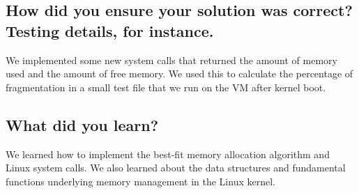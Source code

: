 \documentclass[draftclsnofoot,onecolumn,10pt,compsoc]{IEEEtran}
\begin{document}
\subsection{How did you ensure your solution was correct? Testing details, for instance.}
We implemented some new system calls that returned the amount of memory used and the amount of free memory. We used this to calculate the percentage of fragmentation in a small test file that we run on the VM after kernel boot.
\subsection{What did you learn?}
We learned how to implement the best-fit memory allocation algorithm and Linux system calls. We also learned about the data structures and fundamental functions underlying memory management in the Linux kernel.
\end{document}

